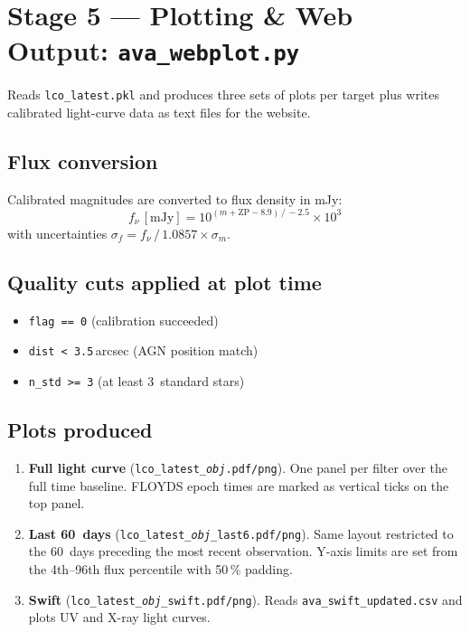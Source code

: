 \documentclass[12pt,a4paper]{article}
\begin{document}
\section{Stage 5 --- Plotting \& Web Output: \texttt{ava\_webplot.py}}
\label{sec:webplot}

Reads \texttt{lco\_latest.pkl} and produces three sets of plots per target plus writes
calibrated light-curve data as text files for the website.

\subsection{Flux conversion}

Calibrated magnitudes are converted to flux density in mJy:
\begin{equation}
  f_\nu \,[\text{mJy}] = 10^{(m + \mathrm{ZP} - 8.9)\,/\,-2.5} \times 10^3
  \label{eq:flux}
\end{equation}
with uncertainties $\sigma_f = f_\nu \,/\, 1.0857 \times \sigma_m$.

\subsection{Quality cuts applied at plot time}

\begin{itemize}[noitemsep]
  \item \texttt{flag == 0} (calibration succeeded)
  \item \texttt{dist < 3.5}\,arcsec (AGN position match)
  \item \texttt{n\_std >= 3} (at least 3~standard stars)
\end{itemize}

\subsection{Plots produced}

\begin{enumerate}
  \item \textbf{Full light curve} (\texttt{lco\_latest\_\textit{obj}.pdf/png}).  One panel
        per filter over the full time baseline.  FLOYDS epoch times are marked as vertical
        ticks on the top panel.
  \item \textbf{Last 60~days} (\texttt{lco\_latest\_\textit{obj}\_last6.pdf/png}).  Same
        layout restricted to the 60~days preceding the most recent observation.  Y-axis
        limits are set from the 4th--96th flux percentile with 50\,\% padding.
  \item \textbf{Swift} (\texttt{lco\_latest\_\textit{obj}\_swift.pdf/png}).  Reads
        \texttt{ava\_swift\_updated.csv} and plots UV and X-ray light curves.
\end{enumerate}
\end{document}
